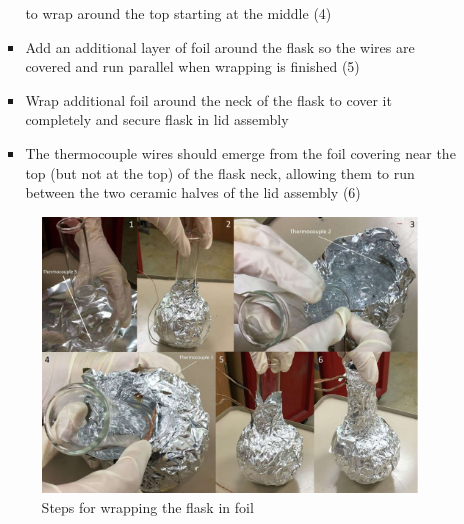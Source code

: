 \documentclass[letterpaper,11pt]{article}
\begin{document}
\begin{itemize}
\begin{itemize}
\begin{itemize}
                     to wrap around the top starting at the middle (4)
                \item Add an additional layer of foil around  the flask so the 
                    wires are covered and run parallel when wrapping is finished
                    (5)
                \item Wrap additional foil around the neck of the flask to cover 
                    it completely and secure flask in lid assembly
                \item The thermocouple wires should emerge from the foil 
                    covering near the top (but not at the top) of the flask 
                    neck, allowing them to run between the two ceramic halves of
                    the lid assembly (6)
                \end{itemize}

\begin{figure}[H]
\centering
\includegraphics[width=1\textwidth]{wrap.jpg}
\caption{Steps for wrapping the flask in foil}
\label{fig:wrap}
\end{figure}


\end{itemize}
\end{itemize}
\end{document}
